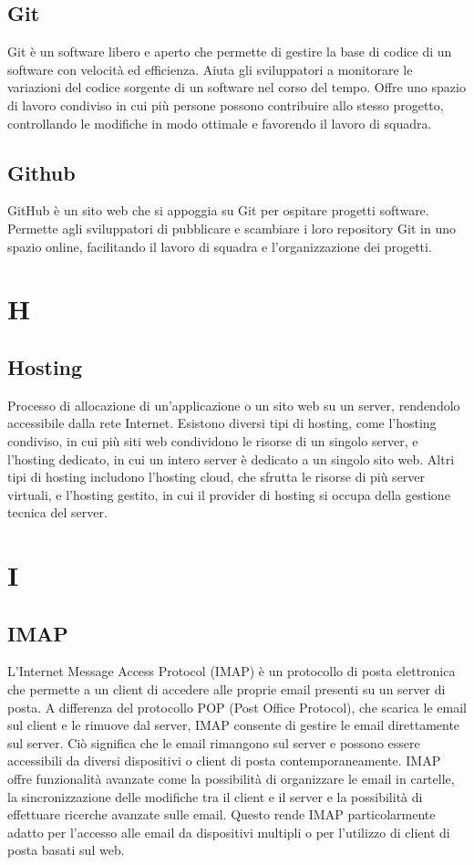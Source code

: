 \documentclass[12pt]{article}
\begin{document}
		\subsection{Git}
			Git è un software libero e aperto che permette di gestire la base di codice di un software con velocità ed efficienza. Aiuta gli sviluppatori a monitorare le variazioni del codice sorgente di un software nel corso del tempo. Offre uno spazio di lavoro condiviso in cui più persone possono contribuire allo stesso progetto, controllando le modifiche in modo ottimale e favorendo il lavoro di squadra.
		\subsection{Github}
			GitHub è un sito web che si appoggia su Git per ospitare progetti software. Permette agli sviluppatori di pubblicare e scambiare i loro repository Git in uno spazio online, facilitando il lavoro di squadra e l’organizzazione dei progetti.
	\clearpage
	\section{H}
		\subsection{Hosting}
			Processo di allocazione di un'applicazione o un sito web su un server, rendendolo accessibile dalla rete Internet. Esistono diversi tipi di hosting, come l'hosting condiviso, in cui più siti web condividono le risorse di un singolo server, e l'hosting dedicato, in cui un intero server è dedicato a un singolo sito web. Altri tipi di hosting includono l'hosting cloud, che sfrutta le risorse di più server virtuali, e l'hosting gestito, in cui il provider di hosting si occupa della gestione tecnica del server.
		
	\clearpage
	\section{I}
		\subsection{IMAP}
			L'Internet Message Access Protocol (IMAP) è un protocollo di posta elettronica che permette a un client di accedere alle proprie email presenti su un server di posta. A differenza del protocollo POP (Post Office Protocol), che scarica le email sul client e le rimuove dal server, IMAP consente di gestire le email direttamente sul server. Ciò significa che le email rimangono sul server e possono essere accessibili da diversi dispositivi o client di posta contemporaneamente. IMAP offre funzionalità avanzate come la possibilità di organizzare le email in cartelle, la sincronizzazione delle modifiche tra il client e il server e la possibilità di effettuare ricerche avanzate sulle email. Questo rende IMAP particolarmente adatto per l'accesso alle email da dispositivi multipli o per l'utilizzo di client di posta basati sul web.
\end{document}
